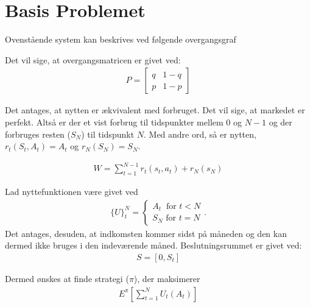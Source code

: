 \section{Basis Problemet}
Ovenstående system kan beskrives ved følgende overgangsgraf\\

Det vil sige, at overgangsmatricen er givet ved:\\
\begin{align*}
    P=\begin{bmatrix}q & 1-q\\ p & 1-p\end{bmatrix}
\end{align*}

Det antages, at nytten er ækvivalent med forbruget. Det vil sige, at markedet er perfekt. Altså er der et vist forbrug til tidspunkter mellem 0 og $N-1$ og der forbruges resten ($S_N$) til tidspunkt $N$. Med andre ord, så er nytten, $r_t(S_t,A_t)=A_t$ og $r_N(S_N)=S_N$.


\begin{align*}
    W=\sum_{t=1}^{N-1} r_t(s_t,a_t)+ r_N(s_N)
\end{align*}

Lad nyttefunktionen være givet ved
\begin{align*}
    \{U\}_t^N=\begin{cases}A_t\ \text{ for } t<N\\ S_N \text{ for } t=N \end{cases}.
\end{align*}
Det antages, desuden, at indkomsten kommer sidst på måneden og den kan dermed ikke bruges i den indeværende måned. Beslutningsrummet er givet ved:
\begin{align*}
    S=[0,S_t]
\end{align*}

Dermed ønskes at finde strategi ($\pi$), der maksimerer
\begin{align*}
    E^\pi \left[\sum_{t=1}^N U_t(A_t)\right]
\end{align*}





